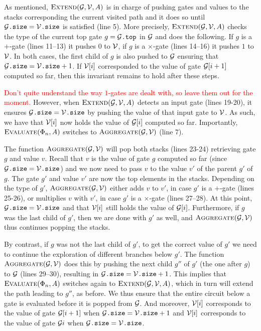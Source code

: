 As mentioned,  $\textsc{Extend}(\mathcal{G},\mathcal{V},A)$ is in charge of pushing gates and values to the stacks corresponding the current visited path and it does so until $\mathcal{G}\texttt{.size} = \mathcal{V}\texttt{.size}$ is satisfied (line 5). More precisely,
$\textsc{Extend}(\mathcal{G},\mathcal{V},A)$ checks the type of the current top gate $g=\mathcal{G}\texttt{.top}$ in $\mathcal{G}$ and does the following.
If $g$ is a $+$-gate (lines 11--13) it pushes $0$ to $\mathcal{V}$, if $g$ is a $\times$-gate (lines 14--16) it pushes $1$ to $\mathcal{V}$.
In both cases, the first child of $g$ is also pushed to $\mathcal{G}$ ensuring that $\mathcal{G}\texttt{.size} = \mathcal{V}\texttt{.size}+1$. If $\mathcal{V}[i]$ corresponded to the value of gate $\mathcal{G}[i+1]$ computed so far, then this invariant remains to hold after these steps.

\textcolor{red}{Don't quite understand the way $1$-gates are dealt with, so leave them out for the moment.}
However, when $\textsc{Extend}(\mathcal{G},\mathcal{V},A)$ detects an input gate (lines 19-20), it ensures  $\mathcal{G}\texttt{.size} = \mathcal{V}\texttt{.size}$
by pushing the value of that input gate to $\mathcal{V}$. As such, we have that $\mathcal{V}[i]$ now holds the value of $\mathcal{G}[i]$ computed so far.
Importantly, $\textsc{Evaluate}(\Phi_n,A)$ switches to $\textsc{Aggregate}(\mathcal{G},\mathcal{V})$ (line 7). 

The function $\textsc{Aggregate}(\mathcal{G},\mathcal{V})$ 
will pop both stacks (lines 23-24) retrieving gate $g$ and value $v$. Recall that $v$ is the value of gate $g$ computed so far (since  $\mathcal{G}\texttt{.size} = \mathcal{V}\texttt{.size}$) and we now need to pass $v$ to the value $v'$ of the parent  $g'$ of $g$. The gate $g'$ and value $v'$  are now the top elements in the stacks.
Depending on the type of $g'$, $\textsc{Aggregate}(\mathcal{G},\mathcal{V})$ either adds $v$ to $v'$, in case $g'$ is a $+$-gate (lines 25-26), or multiplies $v$ with $v'$, in case $g'$ is a $\times$-gate (lines 27--28). At this point,
$\mathcal{G}\texttt{.size} = \mathcal{V}\texttt{.size}$ and that $\mathcal{V}[i]$ still holds the value of $\mathcal{G}[i]$. Furthermore, if $g$ was the last child
of $g'$, then we are done with $g'$ as well, and $\textsc{Aggregate}(\mathcal{G},\mathcal{V})$ thus continues popping the stacks. 

By contrast,
if $g$ was not the last child of $g'$, to get the correct value of $g'$ we need to continue the exploration of different branches
below $g'$. The function $\textsc{Aggregate}(\mathcal{G},\mathcal{V})$ does this by pushing the next child $g''$ of $g'$ (the one after $g$) to $\mathcal{G}$ (lines 29--30), resulting in $\mathcal{G}\texttt{.size} = \mathcal{V}\texttt{.size}+1$. This implies that $\textsc{Evaluate}(\Phi_n,A)$ switches again to $\textsc{Extend}(\mathcal{G},\mathcal{V},A)$, which in turn will extend the path leading to $g''$, as before. We thus ensure
that the entire circuit below a gate is evaluated before it is popped from $\mathcal{G}$. And moreover, $\mathcal{V}[i]$ corresponds to the value of gate $\mathcal{G}[i+1]$ when $\mathcal{G}\texttt{.size} = \mathcal{V}\texttt{.size}+1$ and $\mathcal{V}[i]$ corresponds to the value of gate $\mathcal{G}{i}$ when
 $\mathcal{G}\texttt{.size} = \mathcal{V}\texttt{.size}$. 
 
